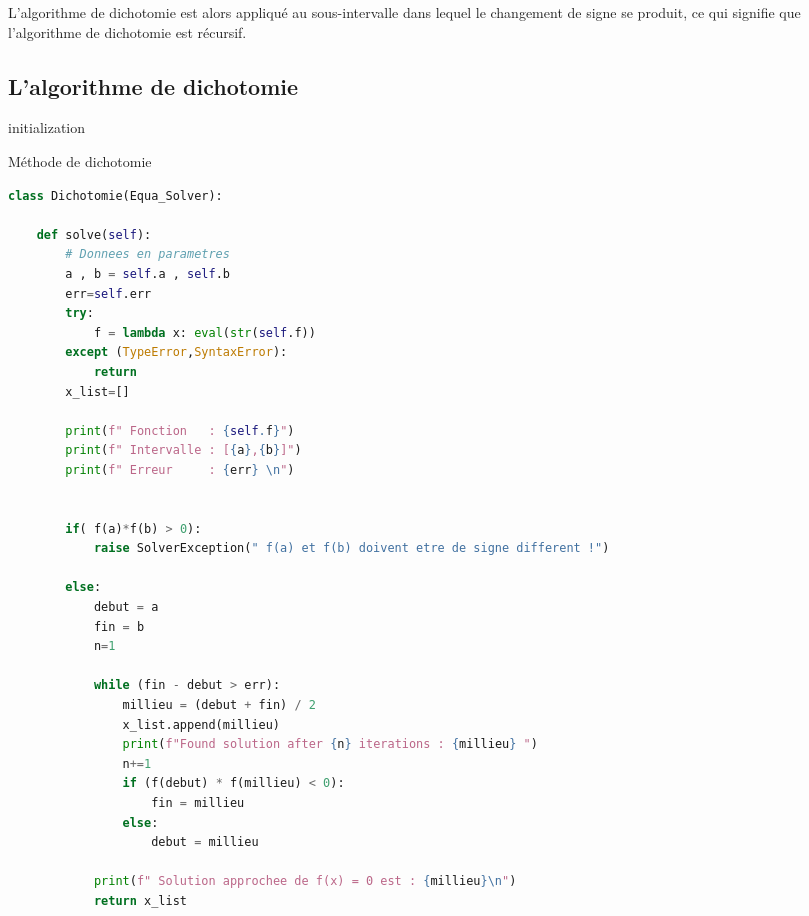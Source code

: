 \documentclass{article}
\begin{document}
L’algorithme de dichotomie est alors appliqué au sous-intervalle dans lequel le changement de signe se produit, ce qui signifie que l’algorithme de dichotomie est récursif.
\subsection{L'algorithme de dichotomie}

\begin{algorithm}[H]
\SetAlgoLined
{}
 initialization\;
 \caption{Méthode de dichotomie}
\end{algorithm}


\lstset{style=mystyle}
\newpage
\begin{lstlisting}[language=Python, caption=Méthode de dichotomie en Python]
class Dichotomie(Equa_Solver):

    def solve(self):
        # Donnees en parametres
        a , b = self.a , self.b
        err=self.err
        try:
            f = lambda x: eval(str(self.f))
        except (TypeError,SyntaxError):
            return
        x_list=[]

        print(f" Fonction   : {self.f}")
        print(f" Intervalle : [{a},{b}]")
        print(f" Erreur     : {err} \n")


        if( f(a)*f(b) > 0):
            raise SolverException(" f(a) et f(b) doivent etre de signe different !")

        else:
            debut = a
            fin = b
            n=1

            while (fin - debut > err):
                millieu = (debut + fin) / 2
                x_list.append(millieu)
                print(f"Found solution after {n} iterations : {millieu} ")
                n+=1
                if (f(debut) * f(millieu) < 0):
                    fin = millieu
                else:
                    debut = millieu

            print(f" Solution approchee de f(x) = 0 est : {millieu}\n")
            return x_list
\end{lstlisting}
\end{document}
